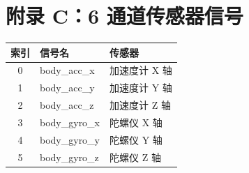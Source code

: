 \documentclass[12pt,a4paper]{ctexart}
\begin{document}
\section*{附录 C：6 通道传感器信号}

\begin{table}[h]
\centering
\begin{tabular}{@{}cll@{}}
\toprule
\textbf{索引} & \textbf{信号名} & \textbf{传感器} \\
\midrule
0 & body\_acc\_x  & 加速度计 X 轴 \\
1 & body\_acc\_y  & 加速度计 Y 轴 \\
2 & body\_acc\_z  & 加速度计 Z 轴 \\
3 & body\_gyro\_x & 陀螺仪 X 轴 \\
4 & body\_gyro\_y & 陀螺仪 Y 轴 \\
5 & body\_gyro\_z & 陀螺仪 Z 轴 \\
\bottomrule
\end{tabular}
\end{table}
\end{document}
